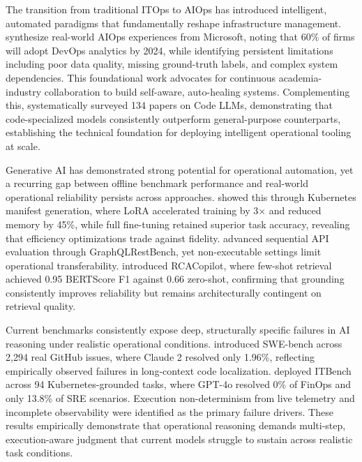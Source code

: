 \documentclass[11pt]{article}
\begin{document}

The transition from traditional ITOps to AIOps has introduced intelligent, automated paradigms that fundamentally reshape infrastructure management. \cite{dang2019aiops} synthesize real-world AIOps experiences from Microsoft, noting that 60\% of firms will adopt DevOps analytics by 2024, while identifying persistent limitations including poor data quality, missing ground-truth labels, and complex system dependencies. This foundational work advocates for continuous academia-industry collaboration to build self-aware, auto-healing systems. Complementing this, \cite{zheng2023survey} systematically surveyed 134 papers on Code LLMs, demonstrating that code-specialized models consistently outperform general-purpose counterparts, establishing the technical foundation for deploying intelligent operational tooling at scale.

Generative AI has demonstrated strong potential for operational automation, yet a recurring gap between offline benchmark performance and real-world operational reliability persists across approaches. \cite{sacco2025intent} showed this through Kubernetes manifest generation, where LoRA accelerated training by 3× and reduced memory by 45\%, while full fine-tuning retained superior task accuracy, revealing that efficiency optimizations trade against fidelity. \cite{saha-etal-2024-sequential} advanced sequential API evaluation through GraphQLRestBench, yet non-executable settings limit operational transferability. \cite{shan2025rca} introduced RCACopilot, where few-shot retrieval achieved 0.95 BERTScore F1 against 0.66 zero-shot, confirming that grounding consistently improves reliability but remains architecturally contingent on retrieval quality.

Current benchmarks consistently expose deep, structurally specific failures in AI reasoning under realistic operational conditions. \cite{jimenez2023swe} introduced SWE-bench across 2,294 real GitHub issues, where Claude 2 resolved only 1.96\%, reflecting empirically observed failures in long-context code localization. \cite{jha2025itbench} deployed ITBench across 94 Kubernetes-grounded tasks, where GPT-4o resolved 0\% of FinOps and only 13.8\% of SRE scenarios. Execution non-determinism from live telemetry and incomplete observability were identified as the primary failure drivers. These results empirically demonstrate that operational reasoning demands multi-step, execution-aware judgment that current models struggle to sustain across realistic task conditions.
\end{document}
